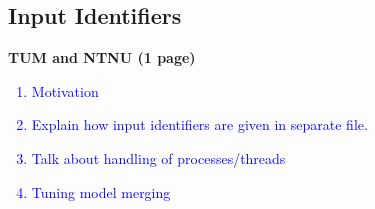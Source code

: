 \subsection{Input Identifiers} \label{sec:input}
\textbf{TUM and NTNU (1 page)}
\textcolor{blue}{
\begin{enumerate}
	\item Motivation
	\item Explain how input identifiers are given in separate file.
	\item Talk about handling of processes/threads
	\item Tuning model merging
\end{enumerate}}
